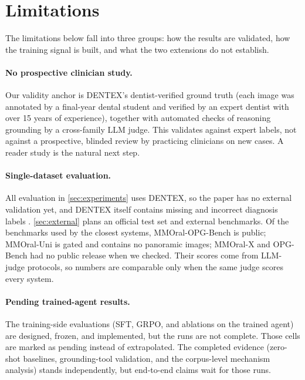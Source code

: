 \section{Limitations}
\label{sec:limitations}

The limitations below fall into three groups: how the results are validated, how the training signal is built, and
what the two extensions do not establish.

\paragraph{No prospective clinician study.}
Our validity anchor is DENTEX's dentist-verified ground truth (each image was annotated by a
final-year dental student and verified by an expert dentist with over 15 years of experience),
together with automated checks of reasoning grounding by a cross-family LLM judge. This
validates against expert labels, not against a prospective, blinded review by practicing
clinicians on new cases. A reader study is the natural next step.

\paragraph{Single-dataset evaluation.}
All evaluation in \cref{sec:experiments} uses DENTEX, so the paper has no external validation yet, and DENTEX itself
contains missing and incorrect diagnosis labels \citep{nistelrooij2024combining}. \cref{sec:external} plans an official
test set and external benchmarks. Of the benchmarks used by the closest systems, MMOral-OPG-Bench is public; MMOral-Uni
is gated and contains no panoramic images; MMOral-X and OPG-Bench had no public release when we checked. Their scores
come from LLM-judge protocols, so numbers are comparable only when the same judge scores every system.

\paragraph{Pending trained-agent results.}
The training-side evaluations (SFT, GRPO, and ablations on the trained agent) are designed,
frozen, and implemented, but the runs are not complete. Those cells are marked as pending
instead of extrapolated. The completed evidence (zero-shot baselines, grounding-tool
validation, and the corpus-level mechanism analysis) stands independently, but end-to-end
claims wait for those runs.


